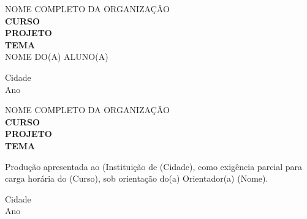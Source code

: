\documentclass[a4paper,10pt,titlepage]{article}
\begin{document}
 

\begin{titlepage}
    \begin{justify}
        \begin{center}
            \begin{large} 
                NOME COMPLETO DA ORGANIZAÇÃO\\[1.5cm]
                \textbf{CURSO}\\[0.5cm]
                \textbf{PROJETO}\\[3cm]
                \textbf{TEMA}\\[6cm]
            
                NOME DO(A) ALUNO(A)\vfill
            
                Cidade\\[0.5cm]
                Ano\\
            \end{large}
        \end{center}
    \end{justify}
\end{titlepage}


\begin{titlepage}
    \begin{justify}
        \begin{center}
            \begin{large} 
                NOME COMPLETO DA ORGANIZAÇÃO\\[1.5cm]
                \textbf{CURSO}\\[0.5cm]
                \textbf{PROJETO}\\[3cm]
                \textbf{TEMA}\\[6cm]
            
                \hspace{.45\textwidth}
                
        \begin{flushright}        
            \begin{minipage}{.5\textwidth} 
                Produção apresentada ao (Instituição de (Cidade), como exigência parcial para carga horária do (Curso), sob orientação do(a) Orientador(a) (Nome).
            \end{minipage}
        \end{flushright}\vfill 
        
                Cidade\\[0.5cm]
                Ano\\
            \end{large}
        \end{center}
    \end{justify}
\end{titlepage}
\end{document}

